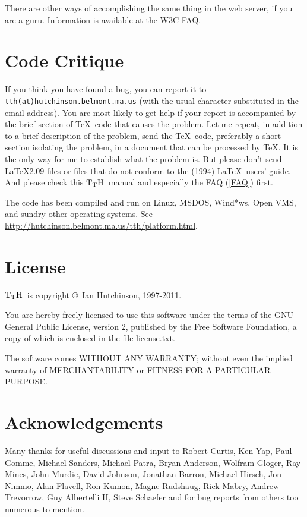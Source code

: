 \documentclass[12pt]{article}
\def\TtH{$\rm{}T_TH$}
\begin{document}
There are other ways of accomplishing the same thing in the web
server, if you are a guru. Information is available at 
\href{http://www.w3.org/International/questions/qa-htaccess-charset}{the
  W3C FAQ}.


\section{Code Critique}

If you think you have found a bug, you can report it to
\verb!tth(at)hutchinson.belmont.ma.us! (with the usual character
substituted in the email address).  You are most likely to get help if
your report is accompanied by the brief section of \TeX\ code that
causes the problem. Let me repeat, in addition to a brief description
of the problem, send the \TeX\ code, preferably a short
section isolating the problem, in a document that can be processed
by \TeX. It is the only way for me to establish
what the problem is. But please don't send \LaTeX2.09 files or files
that do not conform to the (1994) \LaTeX\ users' guide. And
please check this \TtH\ manual and especially the FAQ (\ref{FAQ}) first.

The code has been compiled and run on Linux, MSDOS, Wind*ws, Open VMS,
and sundry other operating systems. See 
\href{http://hutchinson.belmont.ma.us/tth/platform.html}
{http://hutchinson.belmont.ma.us/tth/platform.html}.

\section{License}

\TtH\ is copyright \copyright\ Ian Hutchinson, 1997-2011.

You are hereby freely licensed to use this software under the terms of
the GNU General Public License, version 2, published by the Free
Software Foundation, a copy of which is enclosed in the file
license.txt.

The software comes WITHOUT ANY WARRANTY; without even the implied
warranty of MERCHANTABILITY or FITNESS FOR A PARTICULAR PURPOSE.

\section{Acknowledgements}

Many thanks for useful discussions and input to Robert Curtis, Ken
Yap, Paul Gomme, Michael Sanders, Michael Patra, Bryan Anderson,
Wolfram Gloger, Ray Mines, John Murdie, David Johnson, Jonathan
Barron, Michael Hirsch, Jon Nimmo, Alan Flavell, Ron Kumon, Magne
Rudshaug, Rick Mabry, Andrew Trevorrow, Guy Albertelli II, Steve
Schaefer and for bug
reports from others too numerous to mention.
\end{document}
